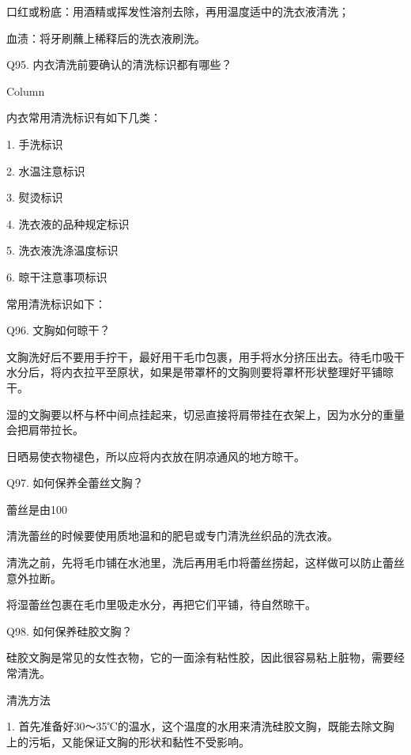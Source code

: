 \documentclass[12pt,UTF8]{ctexbook}
\begin{document}
口红或粉底：用酒精或挥发性溶剂去除，再用温度适中的洗衣液清洗；

血渍：将牙刷蘸上稀释后的洗衣液刷洗。





Q95. 内衣清洗前要确认的清洗标识都有哪些？



Column

内衣常用清洗标识有如下几类：

1. 手洗标识

2. 水温注意标识

3. 熨烫标识

4. 洗衣液的品种规定标识

5. 洗衣液洗涤温度标识

6. 晾干注意事项标识



常用清洗标识如下：





Q96. 文胸如何晾干？


文胸洗好后不要用手拧干，最好用干毛巾包裹，用手将水分挤压出去。待毛巾吸干水分后，将内衣拉平至原状，如果是带罩杯的文胸则要将罩杯形状整理好平铺晾干。

湿的文胸要以杯与杯中间点挂起来，切忌直接将肩带挂在衣架上，因为水分的重量会把肩带拉长。

日晒易使衣物褪色，所以应将内衣放在阴凉通风的地方晾干。





Q97. 如何保养全蕾丝文胸？


蕾丝是由100%

清洗蕾丝的时候要使用质地温和的肥皂或专门清洗丝织品的洗衣液。

清洗之前，先将毛巾铺在水池里，洗后再用毛巾将蕾丝捞起，这样做可以防止蕾丝意外拉断。

将湿蕾丝包裹在毛巾里吸走水分，再把它们平铺，待自然晾干。





Q98. 如何保养硅胶文胸？


硅胶文胸是常见的女性衣物，它的一面涂有粘性胶，因此很容易粘上脏物，需要经常清洗。

清洗方法

1. 首先准备好30～35℃的温水，这个温度的水用来清洗硅胶文胸，既能去除文胸上的污垢，又能保证文胸的形状和黏性不受影响。
\end{document}
